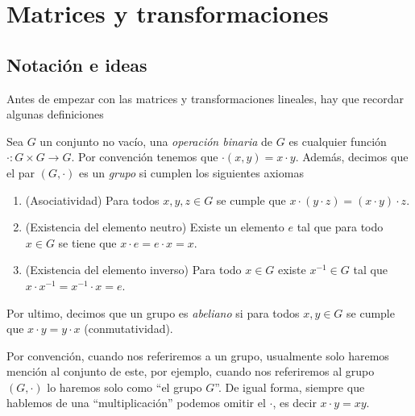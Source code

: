 \chapter{Matrices y transformaciones}

\section{Notación e ideas}

Antes de empezar con las matrices y transformaciones lineales, hay que recordar algunas definiciones

\begin{defi}
  Sea $G$ un conjunto no vacío, una \emph{operación binaria} de $G$ es cualquier función $\cdot \colon G \times G \to G$. Por convención tenemos que $\cdot(x,y) = x \cdot y$. Además, decimos que el par $(G, \cdot)$ es un \emph{grupo} si cumplen los siguientes axiomas
  \begin{enumerate}
    \item (Asociatividad) Para todos $x, y, z \in G$ se cumple que $x\cdot(y\cdot z) = (x\cdot y)\cdot z$.
    \item (Existencia del elemento neutro) Existe un elemento $e$ tal que para todo $x \in G$ se tiene que $x\cdot e = e\cdot x = x$.
    \item (Existencia del elemento inverso) Para todo $x \in G$ existe $x^{-1} \in G$ tal que $x\cdot x^{-1} = x^{-1}\cdot x = e$.
  \end{enumerate}

  Por ultimo, decimos que un grupo es \emph{abeliano} si para todos $x, y \in G$ se cumple que $x\cdot y = y\cdot x$ (conmutatividad).
\end{defi}

Por convención, cuando nos referiremos a un grupo, usualmente solo haremos mención al conjunto de este, por ejemplo, cuando nos referiremos al grupo $(G, \cdot)$ lo haremos solo como ``el grupo $G$''. De igual forma, siempre que hablemos de una ``multiplicación'' podemos omitir el $\cdot$, es decir $x \cdot y = xy$.

